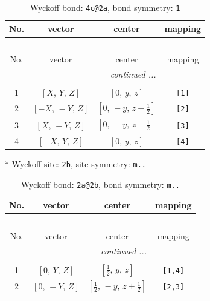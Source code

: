 \documentclass[fleqn,8pt]{jsarticle}
\begin{document}
\renewcommand{\arraystretch}{1.2}
\begin{longtable}{cccc}
\caption{Wyckoff bond: {\tt 4c@2a}, bond symmetry: {\tt 1}}
 \\
 \hline \hline
No. & vector & center & mapping \\ \hline \endfirsthead

\multicolumn{3}{l}{\tablename\ \thetable{}} \\
 \hline \hline
No. & vector & center & mapping \\ \hline \endhead

 \hline \hline
\multicolumn{3}{r}{\footnotesize\it continued ...} \\ \endfoot

 \hline \hline
\multicolumn{3}{r}{} \\ \endlastfoot

1 & $\left[ X,\, Y,\, Z \right]$ & $\left[ 0,\, y,\, z \right]$ & {\tt [1]} \\ \hline
2 & $\left[ - X,\, - Y,\, Z \right]$ & $\left[ 0,\, - y,\, z + \frac{1}{2} \right]$ & {\tt [2]} \\ \hline
3 & $\left[ X,\, - Y,\, Z \right]$ & $\left[ 0,\, - y,\, z + \frac{1}{2} \right]$ & {\tt [3]} \\ \hline
4 & $\left[ - X,\, Y,\, Z \right]$ & $\left[ 0,\, y,\, z \right]$ & {\tt [4]} \\
\end{longtable}
* Wyckoff site: {\tt 2b}, site symmetry: {\tt m..}
\renewcommand{\arraystretch}{1.2}
\begin{longtable}{cccc}
\caption{Wyckoff bond: {\tt 2a@2b}, bond symmetry: {\tt m..}}
 \\
 \hline \hline
No. & vector & center & mapping \\ \hline \endfirsthead

\multicolumn{3}{l}{\tablename\ \thetable{}} \\
 \hline \hline
No. & vector & center & mapping \\ \hline \endhead

 \hline \hline
\multicolumn{3}{r}{\footnotesize\it continued ...} \\ \endfoot

 \hline \hline
\multicolumn{3}{r}{} \\ \endlastfoot

1 & $\left[ 0,\, Y,\, Z \right]$ & $\left[ \frac{1}{2},\, y,\, z \right]$ & {\tt [1,4]} \\ \hline
2 & $\left[ 0,\, - Y,\, Z \right]$ & $\left[ \frac{1}{2},\, - y,\, z + \frac{1}{2} \right]$ & {\tt [2,3]} \\
\end{longtable}
\end{document}
